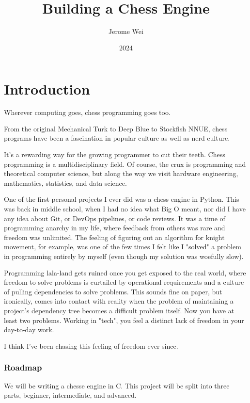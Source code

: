 \documentclass[letterpaper,11pt]{article}
\title{Building a Chess Engine}
\author{Jerome Wei}
\date{2024}
\begin{document}
\maketitle
\newpage
\tableofcontents

\newpage
\part{Introduction}

Wherever computing goes, chess programming goes too.

From the original Mechanical Turk to Deep Blue to Stockfish NNUE, chess programs have been a fascination in popular culture as well as nerd culture.

It's a rewarding way for the growing programmer to cut their teeth. Chess programming is a multidisciplinary field. Of course, the crux is programming and theoretical computer science, but along the way we visit hardware engineering, mathematics, statistics, and data science.

One of the first personal projects I ever did was a chess engine in Python. This was back in middle school, when I had no idea what Big O meant, nor did I have any idea about Git, or DevOps pipelines, or code reviews. It was a time of programming anarchy in my life, where feedback from others was rare and freedom was unlimited. The feeling of figuring out an algorithm for knight movement, for example, was one of the few times I felt like I "solved" a problem in programming entirely by myself (even though my solution was woefully slow).

Programming lala-land gets ruined once you get exposed to the real world, where freedom to solve problems is curtailed by operational requirements and a culture of pulling dependencies to solve problems. This sounds fine on paper, but ironically, comes into contact with reality when the problem of maintaining a project's dependency tree becomes a difficult problem itself. Now you have at least two problems. Working in "tech", you feel a distinct lack of freedom in your day-to-day work.

I think I've been chasing this feeling of freedom ever since.

\section{Roadmap}

We will be writing a chesse engine in C. This project will be split into three parts, beginner, intermediate, and advanced.
\end{document}
